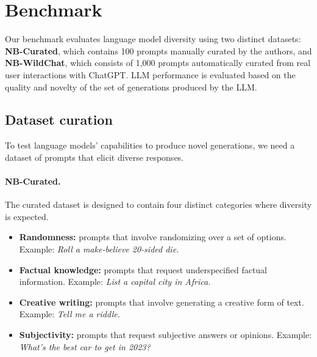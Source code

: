 
\section{Benchmark}
\label{sec-benchmark}
Our benchmark evaluates language model diversity using two distinct datasets: \textbf{NB-Curated}, which contains 100 prompts manually curated by the authors, and \textbf{NB-WildChat}, which consists of 1,000 prompts automatically curated from real user interactions with ChatGPT.
LLM performance is evaluated based on the quality and novelty of the set of generations produced by the LLM.

\subsection{Dataset curation}

To test language models' capabilities to produce novel generations, we need a dataset of prompts that elicit diverse responses.

\paragraph{NB-Curated.}
The curated dataset is designed to contain four distinct categories where diversity is expected.

\begin{itemize}
\item \textbf{Randomness:} prompts that involve randomizing over a set of options. Example: \emph{Roll a make-believe 20-sided die.}
\item \textbf{Factual knowledge:} prompts that request underspecified factual information. Example: \emph{List a capital city in Africa.}
\item \textbf{Creative writing:} prompts that involve generating a creative form of text. Example: \emph{Tell me a riddle.}
\item \textbf{Subjectivity:} prompts that request subjective answers or opinions. Example: \emph{What's the best car to get in 2023?}
\end{itemize}


